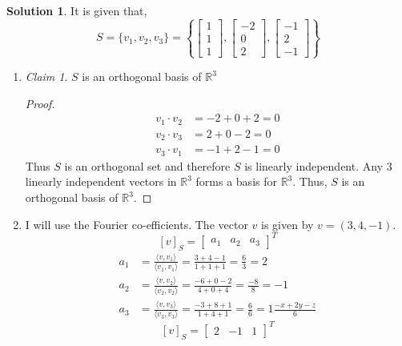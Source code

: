 \documentclass{article}
\theoremstyle{definition}
\newtheorem*{solution}{Solution}
\theoremstyle{remark}
\newtheorem*{theorem}{Claim}
\begin{document}
\begin{solution}

It is given that,
\[
S=\{v_1,v_2,v_3\}=\left\lbrace
\begin{bmatrix}
1 \\ 1 \\ 1
\end{bmatrix},
\begin{bmatrix}
-2 \\ 0 \\ 2
\end{bmatrix},
\begin{bmatrix}
-1 \\ 2 \\ -1
\end{bmatrix}\right\rbrace
\]
\begin{enumerate}[\quad(a)]
 \item
  \begin{theorem}
  $S$ is an orthogonal basis of $\mathbb{R}^3$
  \end{theorem}
  \begin{proof}
  \begin{align*}
  v_1\cdot v_2 & = -2+0+2 = 0 \\
  v_2\cdot v_3 & = 2+0-2 = 0 \\
  v_3\cdot v_1 & = -1+2-1 = 0
  \end{align*}
  Thus $S$ is an orthogonal set and therefore $S$ is linearly independent.
  Any 3 linearly independent vectors in $\mathbb{R}^3$ forms a basis for $\mathbb{R}^3$.
  Thus, $S$ is an orthogonal basis of $\mathbb{R}^3$.
  \end{proof}
 \item
  I will use the Fourier co-efficients.
  The vector $v$ is given by $v=(3,4,-1)$.
  \[
  [v]_S=\begin{bmatrix}
  a_1 & a_2 & a_3
  \end{bmatrix}^T
  \]
  \begin{align*}
  a_1 & = \frac{\langle v,v_1 \rangle}{\langle v_1,v_1 \rangle}
   = \frac{3+4-1}{1+1+1}
   = \frac{6}{3} = 2 \\
  a_2 & = \frac{\langle v,v_2 \rangle}{\langle v_2,v_2 \rangle}
   = \frac{-6+0-2}{4+0+4}
   = \frac{-8}{8} = -1 \\
  a_3 & = \frac{\langle v,v_3 \rangle}{\langle v_3,v_3 \rangle}
   = \frac{-3+8+1}{1+4+1}
   = \frac{6}{6} = 1\frac{-x+2y-z}{6}
  \end{align*}
  \[\boxed{
  [v]_S=\begin{bmatrix}
  2 & -1 & 1
  \end{bmatrix}^T}
\]
\end{enumerate}
\end{solution}
\end{document}
